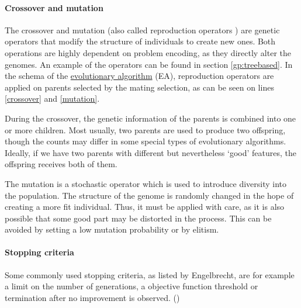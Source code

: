 \paragraph{Crossover and mutation}
The crossover and mutation (also called reproduction operators
\citep{Engelbrecht:2007:CII:1557464}) are genetic operators that modify the
structure of individuals to create new ones. Both operations are highly
dependent on problem encoding, as they directly alter the genomes. An example
of the operators can be found in section \ref{gp:treebased}. In the schema 
of the \hyperref[alg:EA]{evolutionary algorithm} (EA), reproduction operators
are applied on parents selected by the mating selection, as can be seen on 
lines \ref{crossover} and \ref{mutation}.

During the crossover, the genetic information of the parents is combined into
one or more children. Most usually, two parents are used to produce two
offspring, though the counts may differ in some special types of evolutionary
algorithms. Ideally, if we have two parents with different but nevertheless
`good' features, the offspring receives both of them.
\citep{Eiben:2015:IEC:2810085}

The mutation is a stochastic operator which is used to introduce diversity into
the population. The structure of the genome is randomly changed in the hope
of creating a more fit individual. Thus, it must be applied with care, as it is
also possible that some good part may be distorted in the process. This can be
avoided by setting a low mutation probability or by elitism.

\paragraph{Stopping criteria}
Some commonly used stopping criteria, as listed by Engelbrecht, are for example 
a limit on the number of generations, a objective function threshold or
termination after no improvement is observed.
(\citep{Engelbrecht:2007:CII:1557464})


